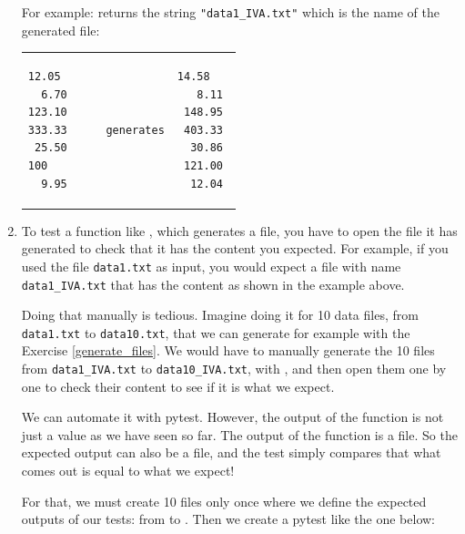 \documentclass[
  fontsize=10pt,
  a4paper,
]{scrartcl}
\begin{document}
\begin{enumerate}
For example:  returns the string \texttt{"data1\_IVA.txt"} which is the name of the generated file:

\begin{tabular}{p{3cm}p{2cm}p{9cm}}

\begin{Verbatim}[frame=single, label={\em data1.txt}]
 12.05
  6.70
123.10
333.33
 25.50
100
  9.95    
\end{Verbatim}
&
\begin{Verbatim}
 
 
 
generates
 
 
   
\end{Verbatim} 
&

\begin{Verbatim}[frame=single, label= the expected content of file {\em data1\_IVA.txt}]
  14.58 
   8.11 
 148.95 
 403.33 
  30.86 
 121.00 
  12.04 
\end{Verbatim}
\end{tabular}


\item To test a function like , which generates a file, you have to open the file it has generated to check that it has the content you expected. For example, if you used the file \texttt{data1.txt} as input, you would expect a file with name \texttt{data1\_IVA.txt} that has the content as shown in the example above.

Doing that manually is tedious. Imagine doing it for 10 data files, from \texttt{data1.txt} to \texttt{data10.txt}, that we can generate for example with the Exercise \ref{generate_files}.
%
We would have to manually generate the 10 files from \texttt{data1\_IVA.txt} to \texttt{data10\_IVA.txt}, with , and then open them one by one to check their content to see if it is what we expect.

We can automate it with pytest. However, the output of the function is not just a value as we have seen so far. The output of the  function is a file. So the expected output can also be a file, and the test simply compares that what comes out is equal to what we expect!

For that, we must create 10 files only once where we define the expected outputs of our tests: from  to . Then we create a pytest like the one below:


\end{enumerate}
\end{document}
